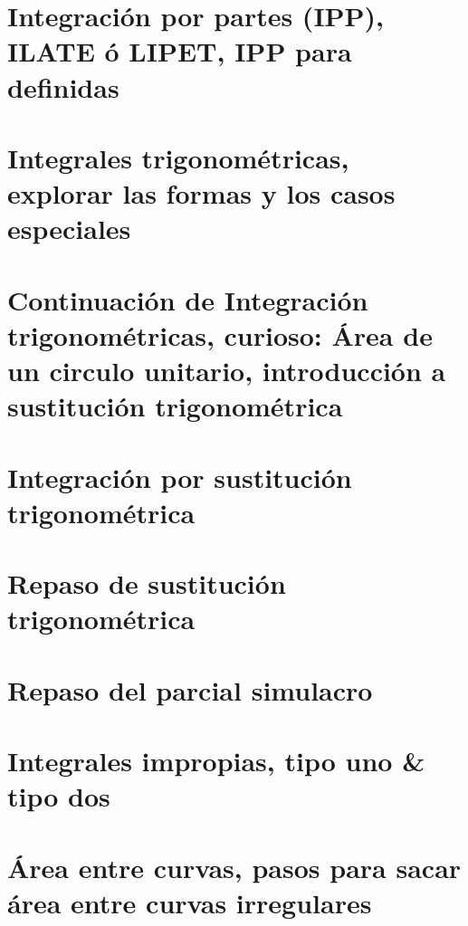 \documentclass[openany]{book}
\begin{document}
\chapter{Integración por partes (IPP), ILATE ó LIPET, IPP para definidas}



\chapter{Integrales trigonométricas, explorar las formas y los casos especiales}



\chapter{Continuación de Integración trigonométricas, curioso: Área de un circulo unitario, introducción a sustitución trigonométrica}



\chapter{Integración por sustitución trigonométrica}



\chapter{Repaso de sustitución trigonométrica} %



\chapter{Repaso del parcial simulacro}



\chapter{Integrales impropias, tipo uno \& tipo dos}



\chapter{\textbf{Área entre curvas}, pasos para sacar área entre curvas irregulares}

\end{document}
